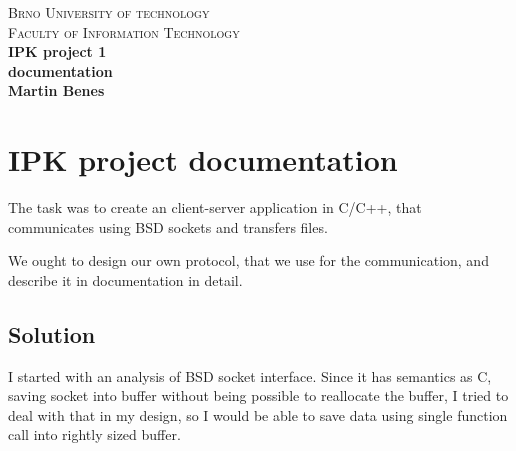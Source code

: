 \documentclass[10pt,a4paper,titlepage]{article}
\begin{document}
\begin{titlepage}

\begin{center}
\textsc{\LARGE Brno University of technology}\\[0.5cm]
\textsc{\large Faculty of Information Technology}\\[8cm]

{ \huge \bfseries IPK project 1}\\[0.3cm]
{ \Large \bfseries documentation}\\[0.5cm]
{ \bfseries Martin Benes}\\

\end{center}

\end{titlepage}
\newpage


\setcounter{page}{1}

\section{IPK project documentation}
The task was to create an client-server application in C/C++, that communicates
using BSD sockets and transfers files.

We ought to design our own protocol, that we use for the communication, and
describe it in documentation in detail.

\subsection{Solution}
I started with an analysis of BSD socket interface. Since it has semantics
as C, saving socket into buffer without being possible to reallocate the buffer,
I tried to deal with that in my design, so I would be able to save data using
single function call into rightly sized buffer.
\end{document}
